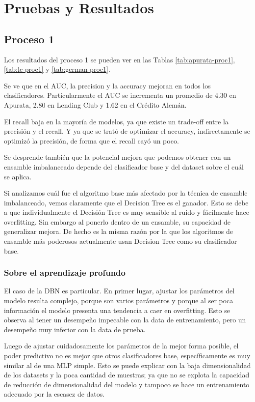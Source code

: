 \chapter{Pruebas y Resultados}

\section{Proceso 1} %

Los resultados del proceso 1 se pueden ver en las Tablas \ref{tab:apurata-proc1}, \ref{tab:lc-proc1} y \ref{tab:german-proc1}.

Se ve que en el AUC, la precision y la accuracy mejoran en todos los clasificadores. Particularmente el AUC se incrementa un promedio de 4.30 en Apurata, 2.80 en Lending Club y 1.62 en el Crédito Alemán.

El recall baja en la mayoría de modelos, ya que existe un trade-off entre la precisión y el recall. Y ya que se trató de optimizar el accuracy, indirectamente se optimizó la precisión, de forma que el recall cayó un poco.

Se desprende también que la potencial mejora que podemos obtener con un ensamble imbalanceado depende del clasificador base y del dataset sobre el cuál se aplica. 

Si analizamos cuál fue el algoritmo base más afectado por la técnica de ensamble imbalanceado, vemos claramente que el Decision Tree es el ganador. Esto se debe a que individualmente el Decisión Tree es muy sensible al ruido y fácilmente hace overfitting. Sin embargo al ponerlo dentro de un ensamble, su capacidad de generalizar mejora. De hecho es la misma razón por la que los algoritmos de ensamble más poderosos actualmente usan Decision Tree como su clasificador base.

\subsection{Sobre el aprendizaje profundo}

El caso de la \ac{DBN} es particular. En primer lugar, ajustar los parámetros del modelo resulta complejo, porque son varios parámetros y porque al ser poca información el modelo presenta una tendencia a caer en overfitting. Esto se observa al tener un desempeño impecable con la data de entrenamiento, pero un desempeño muy inferior con la data de prueba.

Luego de ajustar cuidadosamente los parámetros de la mejor forma posible, el poder predictivo no es mejor que otros clasificadores base, específicamente es muy similar al de una \ac{MLP} simple. Esto se puede explicar con la baja dimensionalidad de los datasets y la poca cantidad de muestras; ya que no se explota la capacidad de reducción de dimensionalidad del modelo y tampoco se hace un entrenamiento adecuado por la escasez de datos.

